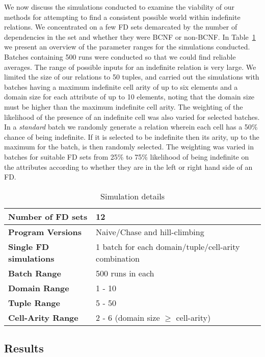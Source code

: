 We now discuss the simulations conducted to examine the 
viability of our methods for attempting to find a
consistent possible world within indefinite relations.
We concentrated on a few FD sets demarcated by the number of
dependencies in the set and whether they were BCNF or non-BCNF. 
In Table~\ref{table:simpar} we present an overview of the parameter
ranges for the simulations
conducted. Batches containing 500 runs were conducted so that we 
could find reliable averages. The range of possible inputs for an indefinite
relation is very large. We limited the size of our relations to 50 tuples,
and carried out the simulations with batches having a maximum indefinite
cell arity of up to six elements and a domain size for each attribute of
up to 10 elements, noting that the domain size must be higher than the
maximum indefinite cell arity.  The weighting of the likelihood of the
presence of an indefinite cell was also varied for selected batches.
In a {\em standard} batch we randomly generate a relation wherein each
cell has a 50\% chance of being indefinite. If it is selected to be
indefinite then its arity, up to the maximum for the batch, is then
randomly selected. The weighting was varied in batches for suitable
FD sets from 25\% to 75\% likelihood of being indefinite on the
attributes according to whether they are in the left or right hand side
of an FD.

{\line
\begin{table}[ht]
\begin{center}
\begin{tabular}{|l||l|}
\hline
{\bf Number of FD sets}  & 12 \\ \hline
{\bf Program Versions} & Naive/Chase and hill-climbing \\ \hline
{\bf Single FD simulations} & 1 batch for each domain/tuple/cell-arity combination\\ \hline
{\bf Batch Range} & 500 runs in each \\ \hline
{\bf Domain Range} & 1 - 10  \\ \hline
{\bf Tuple Range} & 5 - 50  \\ \hline 
{\bf Cell-Arity Range} & 2 - 6 (domain size $\ge$ cell-arity) \\ \hline 
\end{tabular}
\end{center}
\caption{\label{table:simpar} Simulation details }
\end{table}
}



\subsection{Results}\label{sol:res}

